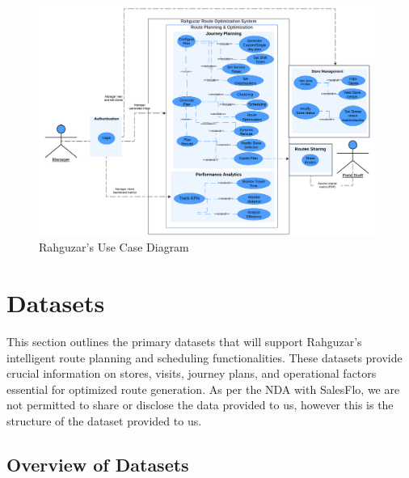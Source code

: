 \begin{center}

    \begin{figure}[H]
        \centering
        \includegraphics[width=0.98\textwidth]{images/Rahguzar - Use Case - Core System.png} 
        \caption{Rahguzar's Use Case Diagram}
    \end{figure}
\end{center}

\section{Datasets}
This section outlines the primary datasets that will support Rahguzar’s intelligent route planning and scheduling functionalities. These datasets provide crucial information on stores, visits, journey plans, and operational factors essential for optimized route generation. As per the NDA with SalesFlo, we are not permitted to share or disclose the data provided to us, however this is the structure of the dataset provided to us. 
\subsection*{Overview of Datasets}

